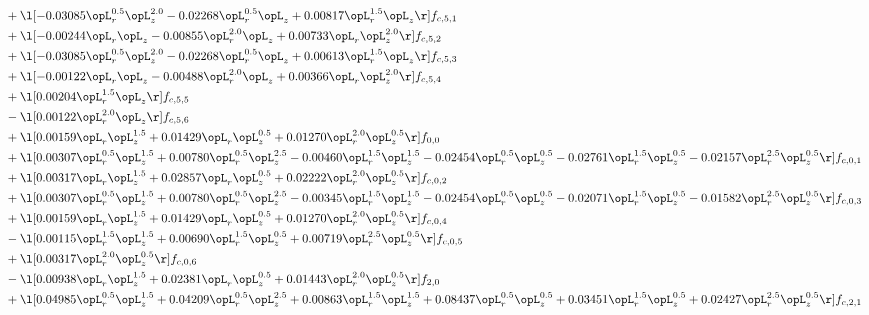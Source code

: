\begin{alignat}{2}
& + \l[  -0.03085 \opL_r^{0.5} \opL_z^{2.0}   -0.02268 \opL_r^{0.5} \opL_z +  0.00817 \opL_r^{1.5} \opL_z  \r] f_{c,5,1} \nonumber \\ 
& + \l[  -0.00244 \opL_r \opL_z   -0.00855 \opL_r^{2.0} \opL_z +  0.00733 \opL_r \opL_z^{2.0}  \r] f_{c,5,2} \nonumber \\ 
& + \l[  -0.03085 \opL_r^{0.5} \opL_z^{2.0}   -0.02268 \opL_r^{0.5} \opL_z +  0.00613 \opL_r^{1.5} \opL_z  \r] f_{c,5,3} \nonumber \\ 
& + \l[  -0.00122 \opL_r \opL_z   -0.00488 \opL_r^{2.0} \opL_z +  0.00366 \opL_r \opL_z^{2.0}  \r] f_{c,5,4} \nonumber \\ 
& + \l[  0.00204 \opL_r^{1.5} \opL_z  \r] f_{c,5,5} \nonumber \\ 
& - \l[  0.00122 \opL_r^{2.0} \opL_z  \r] f_{c,5,6} \nonumber \\ 
& + \l[  0.00159 \opL_r \opL_z^{1.5} +  0.01429 \opL_r \opL_z^{0.5} +  0.01270 \opL_r^{2.0} \opL_z^{0.5}  \r] f_{0,0} \nonumber \\ 
& + \l[  0.00307 \opL_r^{0.5} \opL_z^{1.5} +  0.00780 \opL_r^{0.5} \opL_z^{2.5}   -0.00460 \opL_r^{1.5} \opL_z^{1.5}   -0.02454 \opL_r^{0.5} \opL_z^{0.5}   -0.02761 \opL_r^{1.5} \opL_z^{0.5}   -0.02157 \opL_r^{2.5} \opL_z^{0.5}  \r] f_{c,0,1} \nonumber \\ 
& + \l[  0.00317 \opL_r \opL_z^{1.5} +  0.02857 \opL_r \opL_z^{0.5} +  0.02222 \opL_r^{2.0} \opL_z^{0.5}  \r] f_{c,0,2} \nonumber \\ 
& + \l[  0.00307 \opL_r^{0.5} \opL_z^{1.5} +  0.00780 \opL_r^{0.5} \opL_z^{2.5}   -0.00345 \opL_r^{1.5} \opL_z^{1.5}   -0.02454 \opL_r^{0.5} \opL_z^{0.5}   -0.02071 \opL_r^{1.5} \opL_z^{0.5}   -0.01582 \opL_r^{2.5} \opL_z^{0.5}  \r] f_{c,0,3} \nonumber \\ 
& + \l[  0.00159 \opL_r \opL_z^{1.5} +  0.01429 \opL_r \opL_z^{0.5} +  0.01270 \opL_r^{2.0} \opL_z^{0.5}  \r] f_{c,0,4} \nonumber \\ 
& - \l[  0.00115 \opL_r^{1.5} \opL_z^{1.5} +  0.00690 \opL_r^{1.5} \opL_z^{0.5} +  0.00719 \opL_r^{2.5} \opL_z^{0.5}  \r] f_{c,0,5} \nonumber \\ 
& + \l[  0.00317 \opL_r^{2.0} \opL_z^{0.5}  \r] f_{c,0,6} \nonumber \\ 
& - \l[  0.00938 \opL_r \opL_z^{1.5} +  0.02381 \opL_r \opL_z^{0.5} +  0.01443 \opL_r^{2.0} \opL_z^{0.5}  \r] f_{2,0} \nonumber \\ 
& + \l[  0.04985 \opL_r^{0.5} \opL_z^{1.5} +  0.04209 \opL_r^{0.5} \opL_z^{2.5} +  0.00863 \opL_r^{1.5} \opL_z^{1.5} +  0.08437 \opL_r^{0.5} \opL_z^{0.5} +  0.03451 \opL_r^{1.5} \opL_z^{0.5} +  0.02427 \opL_r^{2.5} \opL_z^{0.5}  \r] f_{c,2,1} \nonumber \\ 

\end{alignat}
